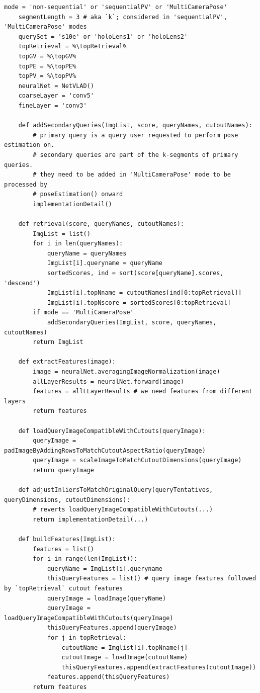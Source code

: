 \documentclass[twoside]{ctuthesis}
\theoremstyle{plain}
\theoremstyle{definition}
\theoremstyle{note}
\newcommand{\todo}[1][]{%
\ifthenelse{\isempty{#1}}{\textbf{TODO}}{\textbf{TODO: #1}}%
}
\newcommand{\topRetrieval}{100} %
\newcommand{\topGV}{10} %
\newcommand{\topPE}{10} %
\newcommand{\topPV}{1} %
\begin{document}
\begin{lstlisting}[style=pseudocode, caption={InLocCIIRC pseudocode. \todo[pseudocode review.]}]
	mode = 'non-sequential' or 'sequentialPV' or 'MultiCameraPose'
	segmentLength = 3 # aka `k`; considered in 'sequentialPV', 'MultiCameraPose' modes
	querySet = 's10e' or 'holoLens1' or 'holoLens2'
	topRetrieval = %\topRetrieval%
	topGV = %\topGV%
	topPE = %\topPE%
	topPV = %\topPV%
	neuralNet = NetVLAD()
	coarseLayer = 'conv5'
	fineLayer = 'conv3'

	def addSecondaryQueries(ImgList, score, queryNames, cutoutNames):
		# primary query is a query user requested to perform pose estimation on.
		# secondary queries are part of the k-segments of primary queries.
		# they need to be added in 'MultiCameraPose' mode to be processed by
		# poseEstimation() onward
		implementationDetail()

	def retrieval(score, queryNames, cutoutNames):
		ImgList = list()
		for i in len(queryNames):
			queryName = queryNames
			ImgList[i].queryname = queryName
			sortedScores, ind = sort(score[queryName].scores, 'descend')
			ImgList[i].topNname = cutoutNames[ind[0:topRetrieval]]
			ImgList[i].topNscore = sortedScores[0:topRetrieval]
		if mode == 'MultiCameraPose'
			addSecondaryQueries(ImgList, score, queryNames, cutoutNames)
		return ImgList

	def extractFeatures(image):
		image = neuralNet.averagingImageNormalization(image)
		allLayerResults = neuralNet.forward(image)
		features = allLLayerResults # we need features from different layers
		return features

	def loadQueryImageCompatibleWithCutouts(queryImage):
		queryImage = padImageByAddingRowsToMatchCutoutAspectRatio(queryImage)
		queryImage = scaleImageToMatchCutoutDimensions(queryImage)
		return queryImage

	def adjustInliersToMatchOriginalQuery(queryTentatives, queryDimensions, cutoutDimensions):
		# reverts loadQueryImageCompatibleWithCutouts(...)
		return implementationDetail(...)

	def buildFeatures(ImgList):
		features = list()
		for i in range(len(ImgList)):
			queryName = ImgList[i].queryname
			thisQueryFeatures = list() # query image features followed by `topRetrieval` cutout features
			queryImage = loadImage(queryName)
			queryImage = loadQueryImageCompatibleWithCutouts(queryImage)
			thisQueryFeatures.append(queryImage)
			for j in topRetrieval:
				cutoutName = Imglist[i].topNname[j]
				cutoutImage = loadImage(cutoutName)
				thisQueryFeatures.append(extractFeatures(cutoutImage))
			features.append(thisQueryFeatures)
		return features


\end{lstlisting}
\end{document}
